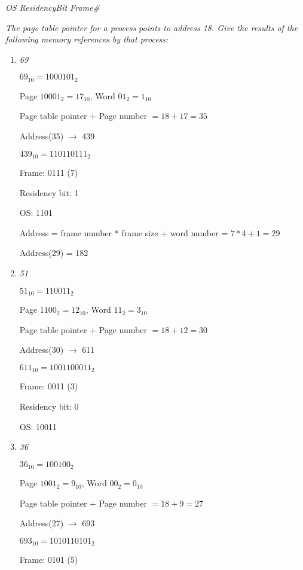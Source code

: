 \documentclass[letterpaper,11pt]{article}
\begin{document}
\begin{enumerate}
\emph{OS ResidencyBit Frame\#}

\emph{The page table pointer for a process points to address 18. Give the results of the following memory references by that process:}

  \begin{enumerate}
    \item \emph{69}

    $69_{10} = 1000101_2$
    
    Page $10001_2 = 17_{10}$, Word $01_2 = 1_{10}$
    
    Page table pointer + Page number $= 18 + 17 = 35$
    
    Address(35) $\rightarrow$ 439
    
    $439_{10} = 110110111_2$
    
    
    Frame: 0111 ($7$)
    
    Residency bit: 1
    
    OS: 1101
    
    
    Address = frame number * frame size + word number = $7 * 4 + 1 = 29$
    
    Address(29) = 182
    \item \emph{51}

    $51_{10} = 110011_2$
    
    Page $1100_2 = 12_{10}$, Word $11_2 = 3_{10}$
    
    Page table pointer + Page number $= 18 + 12 = 30$
    
    Address(30) $\rightarrow$ 611
    
    $611_{10} = 1001100011_2$
    
    
    Frame: 0011 ($3$)
    
    Residency bit: 0
    
    OS: 10011
    
    
    
    \item \emph{36}

    $36_{10} = 100100_2$
    
    Page $1001_2 = 9_{10}$, Word $00_2 = 0_{10}$
    
    Page table pointer + Page number $= 18 + 9 = 27$
    
    Address(27) $\rightarrow$ 693
    
    $693_{10} = 1010110101_2$
    
    
    Frame: 0101 ($5$)
    

\end{enumerate}
\end{enumerate}
\end{document}
